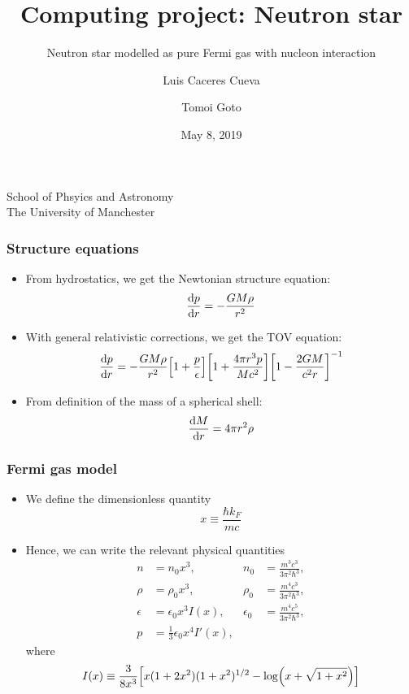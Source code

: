 \documentclass[hperref={pdfpagelabels=false}]{beamer}
\begin{document}
\title
{Computing project: Neutron star}

\subtitle{Neutron star modelled as pure Fermi gas with nucleon interaction}

\author
{Luis Caceres Cueva \and Tomoi Goto}

\institute
{
    School of Phsyics and Astronomy\\
    The University of Manchester
}
\date
{May 8, 2019}

\begin{frame}
 \titlepage
\end{frame}

\begin{frame}
    \frametitle{Structure equations}
    \begin{itemize}
        \item From hydrostatics, we get the Newtonian structure equation: \[\dv{p}{r}=-\frac{GM\rho}{r^{2}}\]
        \item With general relativistic corrections, we get the TOV equation: \[\dv{p}{r}=-\frac{GM\rho}{r^{2}}\qty[1+\frac{p}{\epsilon}]\qty[1+\frac{4\pi r^{3}p}{Mc^{2}}]\qty[1-\frac{2GM}{c^{2}r}]^{-1}\]
        \item From definition of the mass of a spherical shell: \[\dv{M}{r}=4\pi r^{2}\rho\]
    \end{itemize}
\end{frame}

\begin{frame}
    \frametitle{Fermi gas model}
    \begin{itemize}
        \item We define the dimensionless quantity \[x\equiv\frac{\hbar k_{F}}{mc}\]
    \item Hence, we can write the relevant physical quantities
        \begin{align*}
            n&=n_{0}x^{3},&n_{0}&=\frac{m^{3}c^{3}}{3\pi^{2}\hbar^{3}},\\
            \rho&=\rho_{0}x^{3},&\rho_{0}&=\frac{m^{4}c^{3}}{3\pi^{2}\hbar^{3}},\\
            \epsilon&=\epsilon_{0}x^{3}I(x),&\epsilon_{0}&=\frac{m^{4}c^{5}}{3\pi^{2}\hbar^{3}},\\
            p&=\frac{1}{3}\epsilon_{0}x^{4}I'(x),
        \end{align*}
    where \[I(x)\equiv \frac{3}{8x^{3}}\qty[x(1+2x^{2})(1+x^{2})^{1/2}-\log(x+\sqrt{1+x^{2}})]\]
    \end{itemize}
\end{frame}
\end{document}
